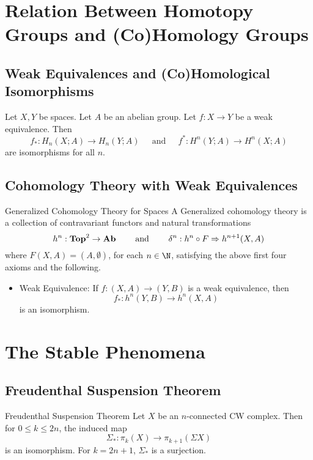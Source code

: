 \documentclass[a4paper]{article}
\begin{document}
\pagebreak
\section{Relation Between Homotopy Groups and (Co)Homology Groups}
\subsection{Weak Equivalences and (Co)Homological Isomorphisms}
\begin{prp}{}{} Let $X,Y$ be spaces. Let $A$ be an abelian group. Let $f:X\to Y$ be a weak equivalence. Then $$f_\ast:H_n(X;A)\to H_n(Y;A)\;\;\;\;\text{ and }\;\;\;\;f^\ast:H^n(Y;A)\to H^n(X;A)$$ are isomorphisms for all $n$. 
\end{prp}

\subsection{Cohomology Theory with Weak Equivalences}
\begin{defn}{Generalized Cohomology Theory for Spaces}{} A Generalized cohomology theory is a collection of contravariant functors and natural transformations $$h^n:\bold{Top}^2\to\bold{Ab}\;\;\;\;\;\;\;\text{ and }\;\;\;\;\;\;\;\delta^n:h^n\circ F\Rightarrow h^{n+1}(X,A)$$ where $F(X,A)=(A,\emptyset)$, for each $n\in\N$, satisfying the above first four axioms and the following. 
\begin{itemize}
\item Weak Equivalence: If $f:(X,A)\to(Y,B)$ is a weak equivalence, then $$f_\ast:h^n(Y,B)\to h^n(X,A)$$ is an isomorphism. 
\end{itemize}
\end{defn}


\pagebreak
\section{The Stable Phenomena}
\subsection{Freudenthal Suspension Theorem}
\begin{thm}{Freudenthal Suspension Theorem}{} Let $X$ be an $n$-connected CW complex. Then for $0\leq k\leq 2n$, the induced map $$\Sigma_\ast:\pi_k(X)\to\pi_{k+1}(\Sigma X)$$ is an isomorphism. For $k=2n+1$, $\Sigma_\ast$ is a surjection. 
\end{thm}
\end{document}
